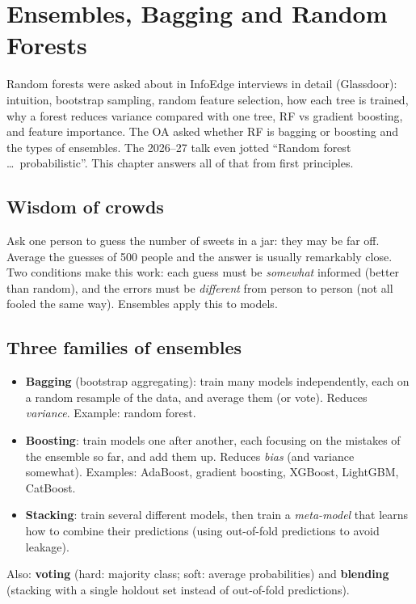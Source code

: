 \chapter{Ensembles, Bagging and Random Forests}

Random forests were asked about in InfoEdge interviews in detail (Glassdoor): intuition, bootstrap sampling, random
feature selection, how each tree is trained, why a forest reduces variance compared with one tree, RF vs gradient
boosting, and feature importance. The OA asked whether RF is bagging or boosting and the types of ensembles. The
2026--27 talk even jotted ``Random forest \dots\ probabilistic''. This chapter answers all of that from first principles.

\section{Wisdom of crowds}
Ask one person to guess the number of sweets in a jar: they may be far off. Average the guesses of 500 people and the
answer is usually remarkably close. Two conditions make this work: each guess must be \emph{somewhat} informed (better
than random), and the errors must be \emph{different} from person to person (not all fooled the same way). Ensembles
apply this to models.

\section{Three families of ensembles}
\begin{itemize}
\item \textbf{Bagging} (bootstrap aggregating): train many models independently, each on a random resample of the data,
  and average them (or vote). Reduces \emph{variance}. Example: random forest.
\item \textbf{Boosting}: train models one after another, each focusing on the mistakes of the ensemble so far, and add
  them up. Reduces \emph{bias} (and variance somewhat). Examples: AdaBoost, gradient boosting, XGBoost, LightGBM, CatBoost.
\item \textbf{Stacking}: train several different models, then train a \emph{meta-model} that learns how to combine their
  predictions (using out-of-fold predictions to avoid leakage).
\end{itemize}
Also: \textbf{voting} (hard: majority class; soft: average probabilities) and \textbf{blending} (stacking with a single holdout
set instead of out-of-fold predictions).

